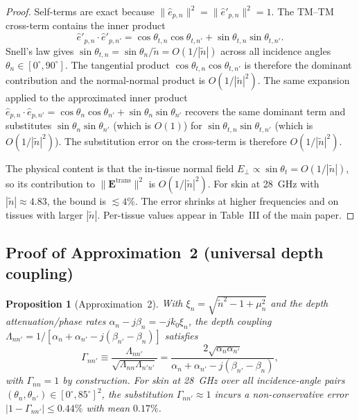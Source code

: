 \documentclass[10pt,journal,twocolumn]{IEEEtran}
\newcommand{\ntilde}{\tilde{n}}
\theoremstyle{plain}
\newtheorem{proposition}{Proposition}[section]
\theoremstyle{definition}
\begin{document}
\begin{proof}
Self-terms are exact because $\|\hat{e}_{p,n}\|^2 =
\|\hat{e}'_{p,n}\|^2 = 1$. The TM--TM cross-term contains the inner
product
\begin{equation}\label{eq:eppdot}
  \hat{e}'_{p,n} \cdot \hat{e}'_{p,n'}
  = \cos\theta_{t,n}\cos\theta_{t,n'}
  + \sin\theta_{t,n}\sin\theta_{t,n'}.
\end{equation}
Snell's law gives $\sin\theta_{t,n} = \sin\theta_n / \ntilde =
O(1/|\ntilde|)$ across all incidence angles
$\theta_n \in [0^{\circ}, 90^{\circ}]$. The tangential product
$\cos\theta_{t,n}\cos\theta_{t,n'}$ is therefore the dominant
contribution and the normal-normal product is $O(1/|\ntilde|^2)$.
The same expansion applied to the approximated inner product
$\hat{e}_{p,n} \cdot \hat{e}_{p,n'} = \cos\theta_n\cos\theta_{n'}
+ \sin\theta_n\sin\theta_{n'}$ recovers the same dominant term and
substitutes $\sin\theta_n\sin\theta_{n'}$ (which is $O(1)$) for
$\sin\theta_{t,n}\sin\theta_{t,n'}$ (which is $O(1/|\ntilde|^2)$).
The substitution error on the cross-term is therefore
$O(1/|\ntilde|^2)$.

The physical content is that the in-tissue normal field
$E_\perp \propto \sin\theta_t = O(1/|\ntilde|)$, so its contribution
to $\|\bm{E}^{\mathrm{trans}}\|^2$ is $O(1/|\ntilde|^2)$. For skin
at 28~GHz with $|\ntilde| \approx 4.83$, the bound is
$\lesssim 4\%$. The error shrinks at higher frequencies and on
tissues with larger $|\ntilde|$. Per-tissue values appear in
Table~III of the main paper.
\end{proof}

\subsection{Proof of Approximation~2 (universal depth coupling)}

\begin{proposition}[Approximation~2]\label{prop:S-approx2}
With $\xi_n = \sqrt{\ntilde^2 - 1 + \mu_n^2}$ and the depth
attenuation/phase rates $\alpha_n - j\beta_n = -j k_0 \xi_n$, the
depth coupling
$\Lambda_{nn'} = 1 / [\alpha_n + \alpha_{n'} - j(\beta_{n'} - \beta_n)]$
satisfies
\begin{equation}\label{eq:Gamma-norm}
  \Gamma_{nn'}
    \equiv \frac{\Lambda_{nn'}}{\sqrt{\Lambda_{nn}\Lambda_{n'n'}}}
    = \frac{2\sqrt{\alpha_n \alpha_{n'}}}
           {\alpha_n + \alpha_{n'} - j(\beta_{n'} - \beta_n)},
\end{equation}
with $\Gamma_{nn} = 1$ by construction. For skin at 28~GHz over all
incidence-angle pairs $(\theta_n, \theta_{n'}) \in
[0^{\circ}, 85^{\circ}]^2$, the substitution $\Gamma_{nn'} \approx 1$
incurs a non-conservative error $|1 - \Gamma_{nn'}| \leq 0.44\%$
with mean $0.17\%$.
\end{proposition}
\end{document}
